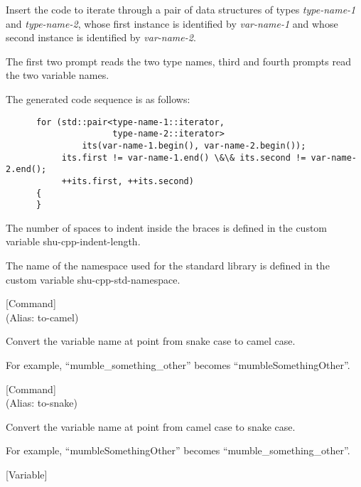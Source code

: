 \begin{doc-string}
Insert the code to iterate through a pair of data structures of types
\emph{type-name-1} and \emph{type-name-2}, whose first instance is identified by \emph{var-name-1}
and whose second instance is identified by \emph{var-name-2}.

The first two prompt reads the two type names, third and fourth prompts read the
two variable names.

The generated code sequence is as follows:

\small{\begin{verbatim}
      for (std::pair<type-name-1::iterator,
                     type-name-2::iterator>
               its(var-name-1.begin(), var-name-2.begin());
           its.first != var-name-1.end() \&\& its.second != var-name-2.end();
           ++its.first, ++its.second)
      {
      }
\end{verbatim}}

The number of spaces to indent inside the braces is defined in the custom
variable shu-cpp-indent-length.

The name of the namespace used for the standard library is defined in the custom
variable shu-cpp-std-namespace.
\end{doc-string}

\vspace{1em}
\noindent
{}
\usebox{\funcname}
 \hfill [Command]\\%
 (Alias: to-camel)

\begin{doc-string}
Convert the variable name at point from snake case to camel case.

For example, ``mumble\_something\_other'' becomes ``mumbleSomethingOther''.
\end{doc-string}

\vspace{1em}
\noindent
{}
\usebox{\funcname}
 \hfill [Command]\\%
 (Alias: to-snake)

\begin{doc-string}
Convert the variable name at point from camel case to snake case.

For example, ``mumbleSomethingOther'' becomes ``mumble\_something\_other''.
\end{doc-string}

\vspace{1em}
\noindent
{}
\usebox{\funcname}
 \hfill [Variable]

